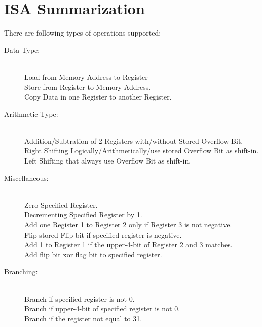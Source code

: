 \documentclass{article}
\begin{document}
  \section{ISA Summarization}
    There are following types of operations supported:
    \begin{description}
      \item[Data Type:] \quad \\
        Load from Memory Address to Register \\
        Store from Register to Memory Address. \\
        Copy Data in one Register to another Register.
      \item[Arithmetic Type:] \quad \\
        Addition/Subtration of 2 Registers with/without Stored Overflow Bit. \\
        Right Shifting Logically/Arithmetically/use stored Overflow Bit as shift-in. \\
        Left Shifting that always use Overflow Bit as shift-in.
      \item[Miscellaneous:] \quad \\
        Zero Specified Register. \\
        Decrementing Specified Register by 1. \\
        Add one Register 1 to Register 2 only if Register 3 is not negative. \\
        Flip stored Flip-bit if specified register is negative. \\
        Add 1 to Register 1 if the upper-4-bit of Register 2 and 3 matches. \\
        Add flip bit xor flag bit to specified register.
      \item[Branching:] \quad \\
        Branch if specified register is not 0. \\
        Branch if upper-4-bit of specified register is not 0. \\
        Branch if the register not equal to 31.
    \end{description}
\end{document}
